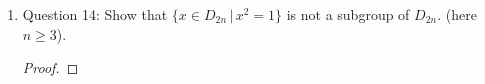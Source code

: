 \documentclass{article}
\begin{document}
\begin{enumerate}
\begin{enumerate}
\begin{proof}
          The given set of elements is not a group because it is not closed
          under addition. In particular, $(1,1)$ and $(-1,0)$ are in the set
          but their sum $(0,1)$ is not.
          inverse
        \end{proof}

      \item Question 14: Show that $\{x\in D_{2n}\,|\,x^2=1\}$ is not a
        subgroup of $D_{2n}$. (here $n\geq3$).

        \begin{proof}
        \end{proof}
    \end{enumerate}
\end{enumerate}
\end{document}
